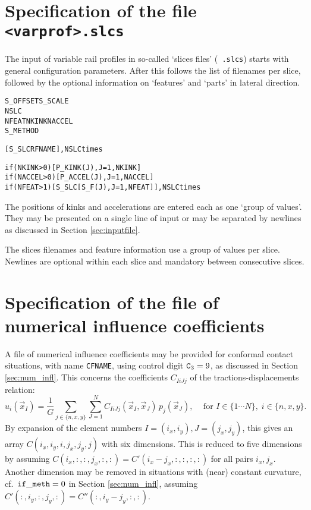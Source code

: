 \documentclass[12pt]{report}
\begin{document}
\section{Specification of the file {\tt <varprof>.slcs}}
\label{sec:spec_slcs}

The input of variable rail profiles in so-called `slices files' ({\tt
.slcs}) starts with general configuration parameters. After this follows
the list of filenames per slice, followed by the optional information on
`features' and `parts' in lateral direction.

\begin{alltt}\small
% General parameters and counters

S_OFFSET   S_SCALE
NSLC
NFEAT      NKINK      NACCEL
S_METHOD

% Slice positions and filenames per slice

[ S_SLC     RFNAME ],  NSLC times

% Feature information per slice

if (NKINK >0)  [ P_KINK(J),  J=1,NKINK    ]
if (NACCEL>0)  [ P_ACCEL(J), J=1,NACCEL   ]
if (NFEAT >1)  [ S_SLC  [ S_F(J), J=1,NFEAT ] ],  NSLC times
\end{alltt}
The positions of kinks and accelerations are entered each as one `group of
values'. They may be presented on a single line of input or may be separated
by newlines as discussed in Section \ref{sec:inputfile}.

The slices filenames and feature information use a group of values
per slice. Newlines are optional within each slice and mandatory between
consecutive slices. 

\section{Specification of the file of numerical influence coefficients}
\label{sec:spec_inflcf}

A file of numerical influence coefficients may be provided for conformal
contact situations, with name {\tt CFNAME}, using control digit
${\tt C}_3=9$, as discussed in Section \ref{sec:num_infl}. This concerns
the coefficients $C_{IiJj}$ of the tractions-displacements relation:
\begin{equation}\label{eq:ui_sum_Cij_pj}
    u_i(\vec{x}_I) = \frac{1}{G} \sum_{j\in\{n,x,y\}}\sum_{J=1}^N
        C_{IiJj}(\vec{x}_I,\vec{x}_J) \, p_j(\vec{x}_J), \;\;\;
        \mbox{ for } I\in\{1\cdots N\}, \; i\in \{n,x,y\}.
\end{equation}
By expansion of the element numbers $I=(i_x,i_y), J=(j_x,j_y)$, this gives
an array $C(i_x,i_y,i,j_x,j_y,j)$ with six dimensions. This is reduced to five
dimensions by assuming $C(i_x,:,:,j_x,:,:)=C'(i_x-j_x,:,:,:,:)$ for all
pairs $i_x,j_x$. Another dimension may be removed in situations with
(near) constant curvature, cf.\ ${\tt if\_meth}=0$ in Section
\ref{sec:num_infl}, assuming $C'(:,i_y,:,j_y,:)=C''(:,i_y-j_y,:,:)$.
\end{document}
